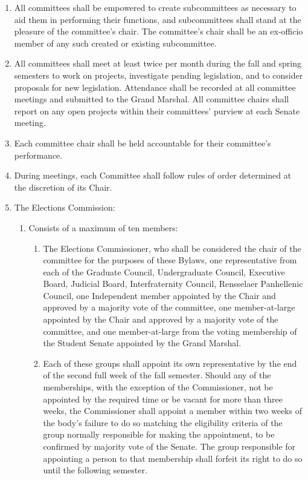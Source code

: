 \begin{enumerate}
\begin{enumerate}
\begin{enumerate}
    \end{enumerate}
  \end{enumerate}
\item All committees shall be empowered to create subcommittees as necessary to aid them in performing their functions, and subcommittees shall stand at the pleasure of the committee’s chair. The committee’s chair shall be an ex-officio member of any such created or existing subcommittee.
\item All committees shall meet at least twice per month during the fall and spring semesters to work on projects, investigate pending legislation, and to consider proposals for new legislation. Attendance shall be recorded at all committee meetings and submitted to the Grand Marshal. All committee chairs shall report on any open projects within their committees’ purview at each Senate meeting.
\item Each committee chair shall be held accountable for their committee’s performance.
\item During meetings, each Committee shall follow rules of order determined at the discretion of its Chair.
\item The Elections Commission:
  \begin{enumerate}
  \item Consists of a maximum of ten members:
    \begin{enumerate}
    \item The Elections Commissioner, who shall be considered the chair of the committee for the purposes of these Bylaws, one representative from each of the Graduate Council, Undergraduate Council, Executive Board, Judicial Board, Interfraternity Council, Rensselaer Panhellenic Council, one Independent member appointed by the Chair and approved by a majority vote of the committee, one member-at-large appointed by the Chair and approved by a majority vote of the committee, and one member-at-large from the voting membership of the Student Senate appointed by the Grand Marshal.
    \item Each of these groups shall appoint its own representative by the end of the second full week of the fall semester. Should any of the memberships, with the exception of the Commissioner, not be appointed by the required time or be vacant for more than three weeks, the Commissioner shall appoint a member within two weeks of the body’s failure to do so matching the eligibility criteria of the group normally responsible for making the appointment, to be confirmed by majority vote of the Senate. The group responsible for appointing a person to that membership shall forfeit its right to do so until the following semester.

\end{enumerate}
\end{enumerate}
\end{enumerate}

